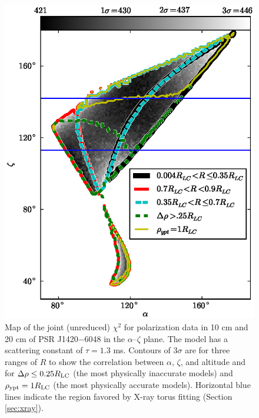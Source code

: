 \begin{figure}[t!!]
\begin{center}
\includegraphics[scale=.8]{chapters/applicationOfNumericalModel/figures/J1420T1.3msMapTot.eps}
\caption[Map of the joint (unreduced) $\chi^{2}$ for polarization data in 10 cm and 20 cm of PSR J1420$-$6048 in the $\alpha$--$\zeta$ plane]{\label{fig:T1.3map}
Map of the joint (unreduced) $\chi^{2}$ for polarization data in 10 cm and 20 cm of PSR J1420$-$6048 in the $\alpha$--$\zeta$ plane. 
The model has a scattering constant of $\tau=1.3$ ms.
Contours of $3\sigma$ are for three ranges of $R$ to show the correlation between $\alpha$, $\zeta$, and altitude and for
$\Delta\rho\leq 0.25R_{\rm{LC}}$ (the most physically inaccurate models) and $\rho_{\rm{ypt}}=1R_{\rm{LC}}$
(the most physically accurate models).  Horizontal blue lines indicate the region favored by X-ray
torus fitting (Section \ref{sec:xray}).
}
\end{center}
\end{figure}


